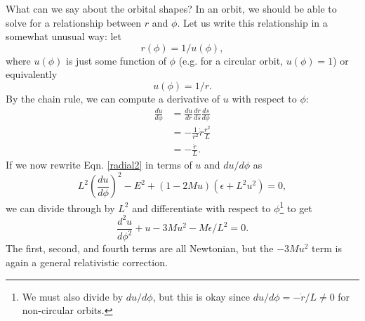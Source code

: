 What can we say about the orbital shapes? In an orbit, we should be able to solve for a relationship between $r$ and $\phi$. Let us write this relationship in a somewhat unusual way: let
$$r(\phi)=1/u(\phi),$$
where $u(\phi)$ is just some function of $\phi$ (e.g. for a circular orbit, $u(\phi)=1$) or equivalently
$$u(\phi)=1/r.$$ 
By the chain rule, we can compute a derivative of $u$ with respect to $\phi$:
\begin{align*}
\frac{du}{d\phi}&= \frac{du}{dr}\frac{dr}{ds}\frac{ds}{d\phi}\\
&= -\frac{1}{r^2} \dot r\frac{r^2}{L}\\
&= -\frac{\dot r}{L}.
\end{align*}
If we now rewrite Eqn. \ref{radial2} in terms of $u$ and $du/d\phi$ as
$$L^2\left(\frac{du}{d\phi}\right)^2-E^2+(1-2Mu)(\epsilon+L^2u^2)=0,$$
we can divide through by $L^2$ and differentiate with respect to $\phi$\footnote{We must also divide by $du/d\phi$, but this is okay since $du/d\phi=-\dot r/L\neq 0$ for non-circular orbits.} to get
$$\frac{d^2u}{d\phi^2}+u-3Mu^2-M\epsilon/L^2=0.$$
The first, second, and fourth terms are all Newtonian, but the $-3Mu^2$ term is again a general relativistic correction.

